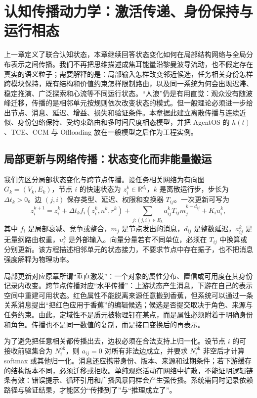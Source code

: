 \chapter{认知传播动力学：激活传递、身份保持与运行相态}
\label{chp:cognitive_dynamics}

上一章定义了联合认知状态，本章继续回答状态变化如何在局部结构网络与全局分布表示之间传播。我们不再把思维描述成焦耳能量沿黎曼波导流动，也不假定存在真实的语义粒子；需要解释的是：局部输入怎样改变邻近候选，任务相关身份怎样跨模块保持，既有结构和价值约束怎样限制路由，以及同一系统为何会出现迟滞、稳定推演、广泛探索和心流等不同运行状态。“人浪”仍是有用直觉：观众没有随波峰迁移，传播的是相邻单元按规则依次改变状态的模式。但一般理论必须进一步给出节点、消息、延迟、增益、损失和验证条件。本章据此建立离散传播与连续近似、身份包络保持、受约束路由和多时间尺度相态模型，并把 AgentOS 的 $h(t)$、TCE、CCM 与 Offloading 放在一般模型之后作为工程实例。

\section{局部更新与网络传播：状态变化而非能量搬运}
\label{sec:vibration_and_energy_flow}

我们先区分局部状态变化与跨节点传播。设任务相关网络为有向图 $G_k=(V_k,E_k)$，节点 $i$ 的快速状态为 $z_i^k\in\mathbb{R}^{d_i}$，$k$ 是离散运行步，步长为 $\Delta t_k>0$。边 $(j,i)$ 保存类型、延迟、权限和变换器 $T_{ij}$。一次更新可写为
\begin{equation}
z_i^{k+1}=z_i^k+\Delta t_k f_i(z_i^k,n^k,r^k)
+\sum_{j:(j,i)\in E_k}a_{ij}^kT_{ij}m_j^{k-d_{ij}}+K_i u_i^k,
\end{equation}
其中 $f_i$ 是局部衰减、竞争或整合，$m_j$ 是节点发出的消息，$d_{ij}$ 是整数延迟，$a_{ij}^k$ 是无量纲路由权重，$u_i^k$ 是外部输入。向量分量若有不同单位，必须在 $T_{ij}$ 中换算或分别更新。该方程描述相邻单元的状态接力，不要求节点中存在振子，也不把消息强度解释为物理功率。

局部更新对应原章所谓“垂直激发”：一个对象的属性分布、置信或可用度在其身份记录内改变。跨节点传播对应“水平传播”：上游状态产生消息，下游在自己的表示空间中重建可用状态。红色属性不能脱离来源任意搬到香蕉，但系统可以通过一条关系消息提出“把红色应用于香蕉”的编辑候选；候选是否提交取决于角色、来源与任务约束。由此，定域性不是质元被物理钉在某点，而是属性必须附着于明确身份和角色。传播也不是同一数值的复制，而是接口变换后的再表示。

为了避免把任意相关都传播出去，边权必须在合法支持上归一化。设节点 $i$ 的可接收前驱集合为 $N_i^{\mathrm{ok}}$，则 $a_{ij}=0$ 对所有非法边成立，并要求 $N_i^{\mathrm{ok}}$ 非空后才计算 softmax 或其他归一化。消息还应携带身份、版本、来源和过期条件；若下游缓存的结构版本不同，必须迁移或拒收。单纯观察活动在网络中扩散，不能证明逻辑链条有效：错误提示、循环引用和广播风暴同样会产生强传播。系统需同时记录依赖路径与验证结果，才能区分“传播到了”与“推理成立了”。

